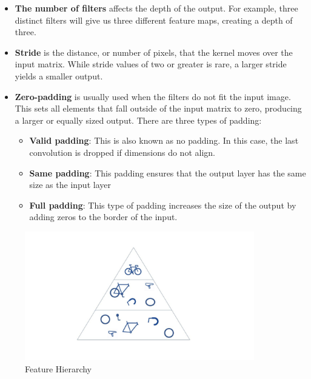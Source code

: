 \begin{enumerate}
        \begin{itemize}
            \item \textbf{The number of filters} affects the depth of the output. For example, three distinct filters will give us three different feature maps, creating a depth of three.
            \item \textbf{Stride} is the distance, or number of pixels, that the kernel moves over the input matrix. While stride values of two or greater is rare, a larger stride yields a smaller output.
            \item \textbf{Zero-padding }is usually used when the filters do not fit the input image. This sets all elements that fall outside of the input matrix to zero, producing a larger or equally sized output. There are three types of padding:
            \begin{itemize}
                \item \textbf{Valid padding}: This is also known as no padding. In this case, the last convolution is dropped if dimensions do not align.
                \item \textbf{Same padding}: This padding ensures that the output layer has the same size as the input layer
                \item \textbf{Full padding}: This type of padding increases the size of the output by adding zeros to the border of the input.
            \end{itemize}
        \end{itemize}
        
        \begin{figure}[H]
            \centering
            \includegraphics[width=10cm]{../images/CNN-Feature-Hierarchy.jpg}
            \caption{Feature Hierarchy}
            \label{fig:CNN-Feature-Hierarchy}
        \end{figure}
        

\end{enumerate}
